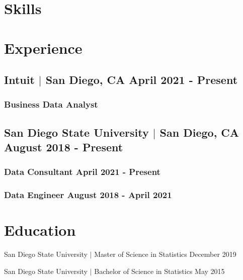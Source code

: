 \documentclass[11pt]{article}
\begin{document}
\thispagestyle{empty}

\section*{Skills}




\section*{Experience}

\subsection*{Intuit $|$ San Diego, CA \hfill April 2021 - Present}

\subsubsection*{Business Data Analyst}



\subsection*{San Diego State University $|$ San Diego, CA \hfill August 2018 - Present}

\subsubsection*{Data Consultant \hfill April 2021 - Present}

\subsubsection*{Data Engineer \hfill August 2018 - April 2021}



\section*{Education}

San Diego State University $|$ Master of Science in Statistics \hfill December 2019

San Diego State University $|$ Bachelor of Science in Statistics \hfill May 2015
\end{document}
